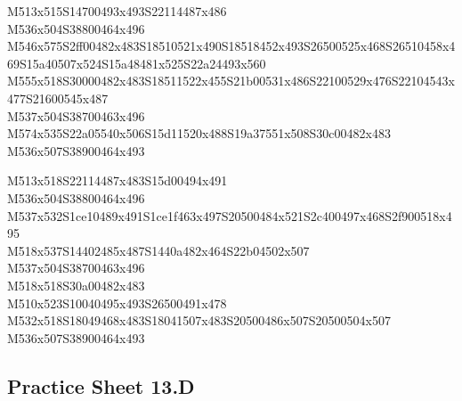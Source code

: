 \documentclass{article}
\begin{document}
\begin{multicols}{5}
\begin{center}
M513x515S14700493x493S22114487x486 %
\\M536x504S38800464x496 %
\\M546x575S2ff00482x483S18510521x490S18518452x493S26500525x468S26510458x469S15a40507x524S15a48481x525S22a24493x560 %
\\M555x518S30000482x483S18511522x455S21b00531x486S22100529x476S22104543x477S21600545x487 %
\\M537x504S38700463x496 %
\\M574x535S22a05540x506S15d11520x488S19a37551x508S30c00482x483 %
\\M536x507S38900464x493 %
\vfil
\columnbreak

M513x518S22114487x483S15d00494x491 %
\\M536x504S38800464x496 %
\\M537x532S1ce10489x491S1ce1f463x497S20500484x521S2c400497x468S2f900518x495 %
\\M518x537S14402485x487S1440a482x464S22b04502x507 %
\\M537x504S38700463x496 %
\\M518x518S30a00482x483 %
\\M510x523S10040495x493S26500491x478 %
\\M532x518S18049468x483S18041507x483S20500486x507S20500504x507 %
\\M536x507S38900464x493 %
\vfil

\end{center}
\end{multicols}

\subsection{Practice Sheet 13.D}
\end{document}
